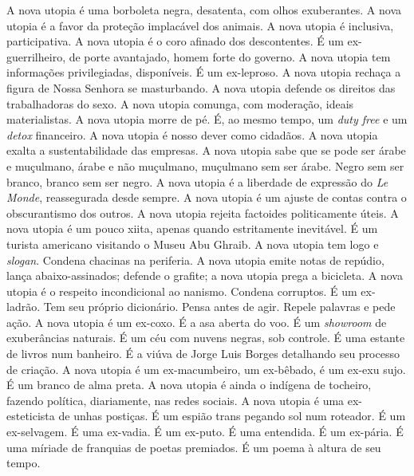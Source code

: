 A nova utopia é uma borboleta negra, desatenta, com olhos exuberantes. A
nova utopia é a favor da proteção implacável dos animais. A nova utopia
é inclusiva, participativa. A nova utopia é o coro afinado dos
descontentes. É um ex-guerrilheiro, de porte avantajado, homem forte do
governo. A nova utopia tem informações privilegiadas, disponíveis. É um
ex-leproso. A nova utopia rechaça a figura de Nossa Senhora se
masturbando. A nova utopia defende os direitos das trabalhadoras do
sexo. A nova utopia comunga, com moderação, ideais materialistas. A nova
utopia morre de pé. É, ao mesmo tempo, um \emph{duty free} e um
\emph{detox} financeiro. A nova utopia é nosso dever como cidadãos. A
nova utopia exalta a sustentabilidade das empresas. A nova utopia sabe
que se pode ser árabe e muçulmano, árabe e não muçulmano, muçulmano sem
ser árabe. Negro sem ser branco, branco sem ser negro. A nova utopia é a
liberdade de expressão do \emph{Le Monde}, reassegurada desde sempre. A
nova utopia é um ajuste de contas contra o obscurantismo dos outros. A
nova utopia rejeita factoides politicamente úteis. A nova utopia é um
pouco xiita, apenas quando estritamente inevitável. É um turista
americano visitando o Museu Abu Ghraib. A nova utopia tem logo e
\emph{slogan}. Condena chacinas na periferia. A nova utopia emite notas
de repúdio, lança abaixo-assinados; defende o grafite; a nova utopia
prega a bicicleta. A nova utopia é o respeito incondicional ao nanismo.
Condena corruptos. É um ex-ladrão. Tem seu próprio dicionário. Pensa
antes de agir. Repele palavras e pede ação. A nova utopia é um ex-coxo.
É a asa aberta do voo. É um \emph{showroom} de exuberâncias naturais. É
um céu com nuvens negras, sob controle. É uma estante de livros num
banheiro. É a viúva de Jorge Luis Borges detalhando seu processo de
criação. A nova utopia é um ex-macumbeiro, um ex-bêbado, é um ex-exu
sujo. É um branco de alma preta. A nova utopia é ainda o indígena de
tocheiro, fazendo política, diariamente, nas redes sociais. A nova
utopia é uma ex-esteticista de unhas postiças. É um espião trans pegando
sol num roteador. É um ex-selvagem. É uma ex-vadia. É um ex-puto. É uma
entendida. É um ex-pária. É uma míriade de franquias de poetas
premiados. É um poema à altura de seu tempo.

